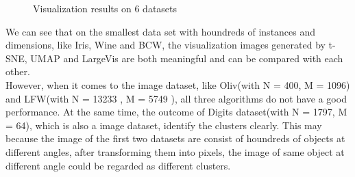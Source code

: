 \begin{figure}[H]
\centering  %
\caption{Visualization results on 6 datasets}
\end{figure}


\noindent We can see that on the smallest data set with houndreds of instances and dimensions, like Iris, Wine and BCW, the visualization images generated by t-SNE, UMAP and LargeVis are both meaningful and can be compared with each other. \\

\noindent However, when it comes to the image dataset, like Oliv(with N = 400, M = 1096) and LFW(with N = 13233 , M = 5749 ), all three algorithms do not have a good performance. At the same time, the outcome of Digits dataset(with N = 1797, M = 64), which is also a image dataset, identify the clusters clearly. This may because the image of the first two datasets are consist of houndreds of objects at different angles, after transforming them into pixels, the image of same object at different angle could be regarded as different clusters. \\

